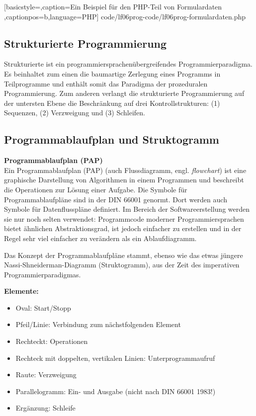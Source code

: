 
	[basicstyle=\small,caption={Ein Beispiel für den PHP-Teil von Formulardaten}
	\label{lst:html-formulardaten},captionpos=b,language=PHP]
	{code/lf06prog-code/lf06prog-formulardaten.php}

\subsection{Strukturierte Programmierung}
Strukturierte ist ein programmiersprachenübergreifendes Programmierparadigma. Es beinhaltet zum einen die baumartige Zerlegung eines Programms in Teilprogramme und enthält somit das Paradigma der prozeduralen Programmierung. Zum anderen verlangt die strukturierte Programmierung auf der untersten Ebene die Beschränkung auf drei Kontrollstrukturen: (1) Sequenzen, (2) Verzweigung und (3) Schleifen.


\subsection{Programmablaufplan und Struktogramm}

{\bf Programmablaufplan (PAP)}~\\

Ein Programmablaufplan (PAP) (auch Flussdiagramm, engl. {\it flowchart}) ist eine graphische Darstellung von Algorithmen in einem Programmen und beschreibt die Operationen zur Lösung einer Aufgabe. Die Symbole für Programmablaufpläne sind in der DIN 66001 genormt. Dort werden auch Symbole für Datenflusspläne definiert. Im Bereich der Softwareerstellung werden sie nur noch selten verwendet: Programmcode moderner Programmiersprachen bietet ähnlichen Abstraktionsgrad, ist jedoch einfacher zu erstellen und in der Regel sehr viel einfacher zu verändern als ein Ablaufdiagramm.

Das Konzept der Programmablaufpläne stammt, ebenso wie das etwas jüngere Nassi-Shneiderman-Diagramm (Struktogramm), aus der Zeit des imperativen
Programmierparadigmas.

{\bf Elemente:}\\
\begin{itemize}
	\item Oval: Start/Stopp\\
	\item Pfeil/Linie: Verbindung zum nächstfolgenden Element\\
	\item Rechteckt: Operationen\\
	\item Rechteck mit doppelten, vertikalen Linien: Unterprogrammaufruf\\
	\item Raute: Verzweigung\\
	\item Parallelogramm: Ein- und Ausgabe (nicht nach DIN 66001 1983!)\\
	\item Ergänzung: Schleife\\
\end{itemize}


